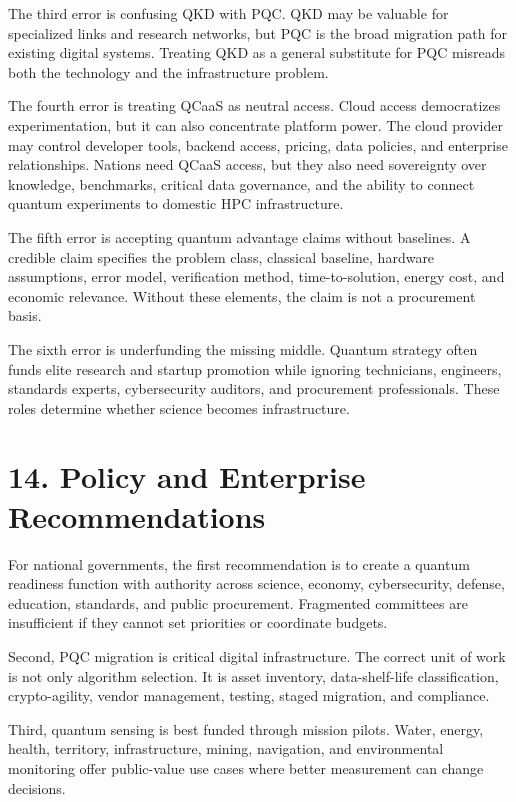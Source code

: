 \documentclass[
  11pt,
  letterpaper,
]{article}
\begin{document}
The third error is confusing QKD with PQC. QKD may be valuable for
specialized links and research networks, but PQC is the broad migration
path for existing digital systems. Treating QKD as a general substitute
for PQC misreads both the technology and the infrastructure problem.

The fourth error is treating QCaaS as neutral access. Cloud access
democratizes experimentation, but it can also concentrate platform
power. The cloud provider may control developer tools, backend access,
pricing, data policies, and enterprise relationships. Nations need QCaaS
access, but they also need sovereignty over knowledge, benchmarks,
critical data governance, and the ability to connect quantum experiments
to domestic HPC infrastructure.

The fifth error is accepting quantum advantage claims without baselines.
A credible claim specifies the problem class, classical baseline,
hardware assumptions, error model, verification method,
time-to-solution, energy cost, and economic relevance. Without these
elements, the claim is not a procurement basis.

The sixth error is underfunding the missing middle. Quantum strategy
often funds elite research and startup promotion while ignoring
technicians, engineers, standards experts, cybersecurity auditors, and
procurement professionals. These roles determine whether science becomes
infrastructure.

\section{14. Policy and Enterprise
Recommendations}\label{policy-and-enterprise-recommendations}

For national governments, the first recommendation is to create a
quantum readiness function with authority across science, economy,
cybersecurity, defense, education, standards, and public procurement.
Fragmented committees are insufficient if they cannot set priorities or
coordinate budgets.

Second, PQC migration is critical digital infrastructure. The correct
unit of work is not only algorithm selection. It is asset inventory,
data-shelf-life classification, crypto-agility, vendor management,
testing, staged migration, and compliance.

Third, quantum sensing is best funded through mission pilots. Water,
energy, health, territory, infrastructure, mining, navigation, and
environmental monitoring offer public-value use cases where better
measurement can change decisions.
\end{document}
